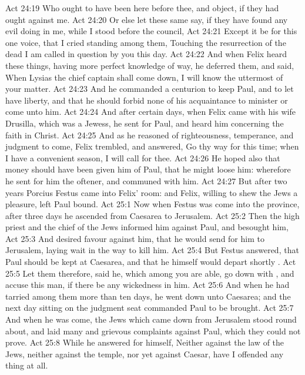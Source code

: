 \vs Act 24:19 Who ought to have been here before thee, and object, if they had ought against me.
\vs Act 24:20 Or else let these same  say, if they have found any evil doing in me, while I stood before the council,
\vs Act 24:21 Except it be for this one voice, that I cried standing among them, Touching the resurrection of the dead I am called in question by you this day.
\vs Act 24:22 And when Felix heard these things, having more perfect knowledge of  way, he deferred them, and said, When Lysias the chief captain shall come down, I will know the uttermost of your matter.
\vs Act 24:23 And he commanded a centurion to keep Paul, and to let  have liberty, and that he should forbid none of his acquaintance to minister or come unto him.
\vs Act 24:24 And after certain days, when Felix came with his wife Drusilla, which was a Jewess, he sent for Paul, and heard him concerning the faith in Christ.
\vs Act 24:25 And as he reasoned of righteousness, temperance, and judgment to come, Felix trembled, and answered, Go thy way for this time; when I have a convenient season, I will call for thee.
\vs Act 24:26 He hoped also that money should have been given him of Paul, that he might loose him: wherefore he sent for him the oftener, and communed with him.
\vs Act 24:27 But after two years Porcius Festus came into Felix' room: and Felix, willing to shew the Jews a pleasure, left Paul bound.
\vs Act 25:1 Now when Festus was come into the province, after three days he ascended from Caesarea to Jerusalem.
\vs Act 25:2 Then the high priest and the chief of the Jews informed him against Paul, and besought him,
\vs Act 25:3 And desired favour against him, that he would send for him to Jerusalem, laying wait in the way to kill him.
\vs Act 25:4 But Festus answered, that Paul should be kept at Caesarea, and that he himself would depart shortly .
\vs Act 25:5 Let them therefore, said he, which among you are able, go down with , and accuse this man, if there be any wickedness in him.
\vs Act 25:6 And when he had tarried among them more than ten days, he went down unto Caesarea; and the next day sitting on the judgment seat commanded Paul to be brought.
\vs Act 25:7 And when he was come, the Jews which came down from Jerusalem stood round about, and laid many and grievous complaints against Paul, which they could not prove.
\vs Act 25:8 While he answered for himself, Neither against the law of the Jews, neither against the temple, nor yet against Caesar, have I offended any thing at all.

